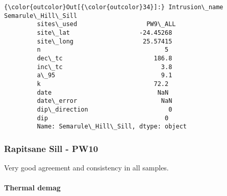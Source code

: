 \documentclass{article}
\begin{document}
            \begin{Verbatim}[commandchars=\\\{\}]
{\color{outcolor}Out[{\color{outcolor}34}]:} Intrusion\_name    Semarule\_Hill\_Sill
         sites\_used                   PW9\_ALL
         site\_lat                   -24.45268
         site\_long                   25.57415
         n                                  5
         dec\_tc                         186.8
         inc\_tc                           3.8
         a\_95                             9.1
         k                               72.2
         date                             NaN
         date\_error                       NaN
         dip\_direction                      0
         dip                                0
         Name: Semarule\_Hill\_Sill, dtype: object
\end{Verbatim}
        
    \subsubsection{Rapitsane Sill - PW10}\label{rapitsane-sill---pw10}

    Very good agreement and consistency in all samples.

    \paragraph{Thermal demag}\label{thermal-demag}
\end{document}
